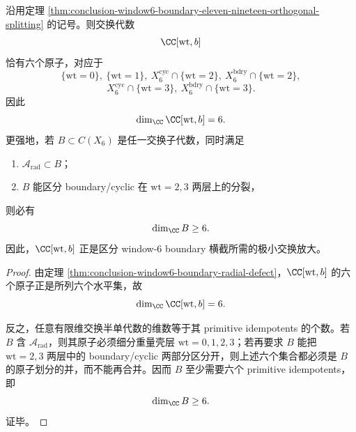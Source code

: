 \begin{theorem}\label{thm:conclusion-window6-boundary-six-atom-minimal-commutative-enlargement}
沿用定理 \ref{thm:conclusion-window6-boundary-eleven-nineteen-orthogonal-splitting} 的记号。则交换代数
\[
\CC[\mathrm{wt},b]
\]
恰有六个原子，对应于
\[
\{\mathrm{wt}=0\},\ \{\mathrm{wt}=1\},\
X_6^{\mathrm{cyc}}\cap\{\mathrm{wt}=2\},\ X_6^{\mathrm{bdry}}\cap\{\mathrm{wt}=2\},
\]
\[
X_6^{\mathrm{cyc}}\cap\{\mathrm{wt}=3\},\ X_6^{\mathrm{bdry}}\cap\{\mathrm{wt}=3\}.
\]
因此
\[
\dim_{\CC}\CC[\mathrm{wt},b]=6.
\]
更强地，若 \(B\subset C(X_6)\) 是任一交换子代数，同时满足
\begin{enumerate}
\normalfont
  \item \(\mathcal A_{\mathrm{rad}}\subset B\)；
  \item \(B\) 能区分 boundary/cyclic 在 \(\mathrm{wt}=2,3\) 两层上的分裂，
\end{enumerate}
则必有
\[
\dim_{\CC}B\ge 6.
\]
因此，\(\CC[\mathrm{wt},b]\) 正是区分 window-\(6\) boundary 横截所需的极小交换放大。
\end{theorem}
\begin{proof}
由定理 \ref{thm:conclusion-window6-boundary-radial-defect}，\(\CC[\mathrm{wt},b]\) 的六个原子正是所列六个水平集，故
\[
\dim_{\CC}\CC[\mathrm{wt},b]=6.
\]

反之，任意有限维交换半单代数的维数等于其 primitive idempotents 的个数。若 \(B\) 含 \(\mathcal A_{\mathrm{rad}}\)，则其原子必须细分重量壳层 \(\mathrm{wt}=0,1,2,3\)；若再要求 \(B\) 能把 \(\mathrm{wt}=2,3\) 两层中的 boundary/cyclic 两部分区分开，则上述六个集合都必须是 \(B\) 的原子划分的并，而不能再合并。因而 \(B\) 至少需要六个 primitive idempotents，即
\[
\dim_{\CC}B\ge 6.
\]
证毕。
\end{proof}

